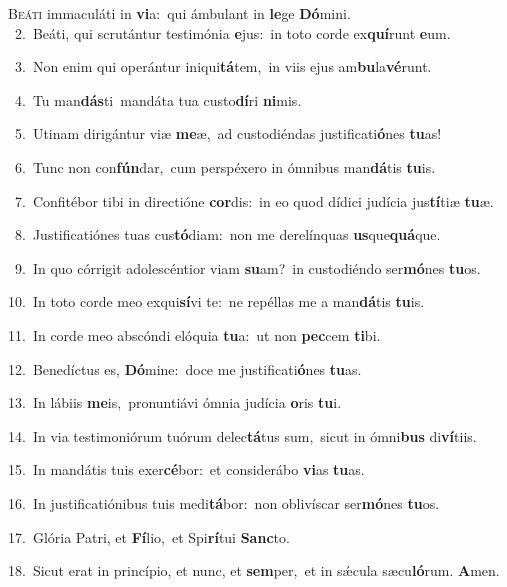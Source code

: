 \lettrine{\initial\textcolor{\initialcolor}{B}}{eáti} immaculáti in \textbf{vi}\-a:~\star qui ámbulant in \textbf{le}\-ge \textbf{Dó}\-mini.\\
{\numbfont\textcolor{\numbcolor}{~2.}}~Beáti, qui scrutántur testimónia \textbf{e}\-jus:~\star in toto corde ex\-\textbf{quí}\-runt \textbf{e}\-um.\par
{\numbfont\textcolor{\numbcolor}{~3.}}~Non enim qui operántur iniqui\-\textbf{tá}\-tem,~\star in viis ejus am\-\textbf{bu}\-la\-\textbf{vé}\-runt.\par
{\numbfont\textcolor{\numbcolor}{~4.}}~Tu man\-\textbf{dás}\-ti~\star mandáta tua custo\-\textbf{dí}\-ri \textbf{ni}\-mis.\par
{\numbfont\textcolor{\numbcolor}{~5.}}~Utinam dirigántur viæ \textbf{me}\-æ,~\star ad custodiéndas justificati\-\textbf{ó}\-nes \textbf{tu}\-as!\par
{\numbfont\textcolor{\numbcolor}{~6.}}~Tunc non con\-\textbf{fún}\-dar,~\star cum perspéxero in ómnibus man\-\textbf{dá}\-tis \textbf{tu}\-is.\par
{\numbfont\textcolor{\numbcolor}{~7.}}~Confitébor tibi in directióne \textbf{cor}\-dis:~\star in eo quod dídici judícia jus\-\textbf{tí}\-tiæ \textbf{tu}\-æ.\par
{\numbfont\textcolor{\numbcolor}{~8.}}~Justificatiónes tuas cus\-\textbf{tó}\-diam:~\star non me derelínquas \textbf{us}\-que\-\textbf{quá}\-que.\par
{\numbfont\textcolor{\numbcolor}{~9.}}~In quo córrigit adolescéntior viam \textbf{su}\-am?~\star in custodiéndo ser\-\textbf{mó}\-nes \textbf{tu}\-os.\par
{\numbfont\textcolor{\numbcolor}{10.}}~In toto corde meo exqui\-\textbf{sí}\-vi te:~\star ne repéllas me a man\-\textbf{dá}\-tis \textbf{tu}\-is.\par
{\numbfont\textcolor{\numbcolor}{11.}}~In corde meo abscóndi elóquia \textbf{tu}\-a:~\star ut non \textbf{pec}\-cem \textbf{ti}\-bi.\par
{\numbfont\textcolor{\numbcolor}{12.}}~Benedíctus es, \textbf{Dó}\-mine:~\star doce me justificati\-\textbf{ó}\-nes \textbf{tu}\-as.\par
{\numbfont\textcolor{\numbcolor}{13.}}~In lábiis \textbf{me}\-is,~\star pronuntiávi ómnia judícia \textbf{o}\-ris \textbf{tu}\-i.\par
{\numbfont\textcolor{\numbcolor}{14.}}~In via testimoniórum tuórum delec\-\textbf{tá}\-tus sum,~\star sicut in ómni\textbf{bus} di\-\textbf{ví}\-tiis.\par
{\numbfont\textcolor{\numbcolor}{15.}}~In mandátis tuis exer\-\textbf{cé}\-bor:~\star et considerábo \textbf{vi}\-as \textbf{tu}\-as.\par
{\numbfont\textcolor{\numbcolor}{16.}}~In justificatiónibus tuis medi\-\textbf{tá}\-bor:~\star non oblivíscar ser\-\textbf{mó}\-nes \textbf{tu}\-os.\par
{\numbfont\textcolor{\numbcolor}{17.}}~Glória Patri, et \textbf{Fí}\-lio,~\star et Spi\-\textbf{rí}\-tui \textbf{Sanc}\-to.\par
{\numbfont\textcolor{\numbcolor}{18.}}~Sicut erat in princípio, et nunc, et \textbf{sem}\-per,~\star et in sǽcula sæcu\-\textbf{ló}\-rum. \textbf{A}\-men.\par

